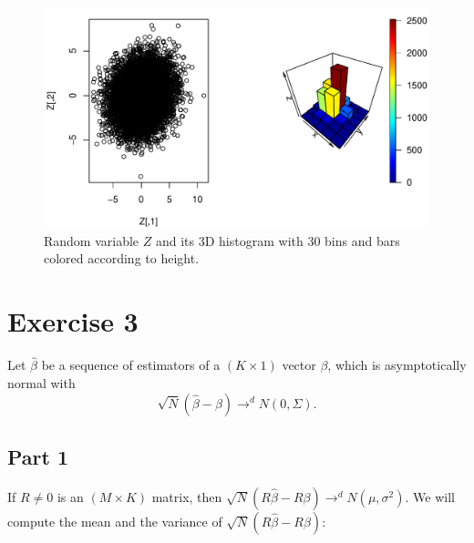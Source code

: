 \documentclass[12pt, a4paper]{article}\usepackage[]{graphicx}\usepackage[]{color}
\makeatletter
\def\maxwidth{ %
  \ifdim\Gin@nat@width>\linewidth
    \linewidth
  \else
    \Gin@nat@width
  \fi
}
\newenvironment{knitrout}{}{} %
\makeatother
\begin{document}
\begin{knitrout}
\color{fgcolor}\begin{figure}[H]

{\centering \includegraphics[width=\maxwidth]{figure/ex2_4histZ-1} 

}

\caption[Random variable $Z$ and its 3D histogram with 30 bins and bars colored according to height]{Random variable $Z$ and its 3D histogram with 30 bins and bars colored according to height.}\label{fig:ex2.4histZ}
\end{figure}


\end{knitrout}




\section{Exercise 3}

Let $\hat{\beta}$ be a sequence of estimators of a $(K\times 1)$ vector $\beta$, which is asymptotically normal with 
\[ \sqrt{N} (\hat{\beta} - \beta) \rightarrow^d N(0,\Sigma) .\]



\subsection{Part 1}

If $R \neq 0$ is an $(M\times K)$ matrix, then $\sqrt{N} (R \hat{\beta} - R\beta) \rightarrow^d N(\mu, \sigma^2)$. We will compute the mean and the variance of $\sqrt{N} (R \hat{\beta} - R \beta)$:
\end{document}
